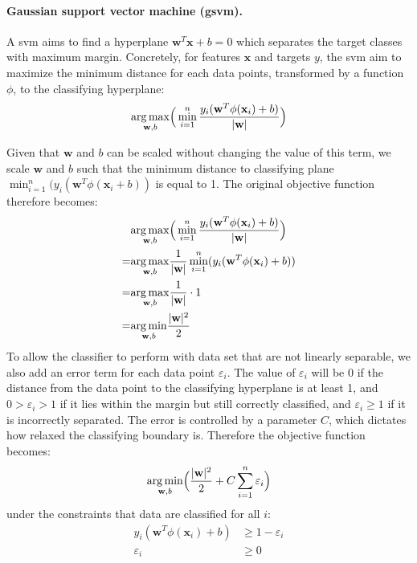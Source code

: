 \paragraph{Gaussian support vector machine (\gls{gsvm}).}
A \gls{svm} aims to find a hyperplane $\mathbf{w}^T\mathbf{x}+b=0$ which separates the target classes with maximum margin. Concretely, for features $\mathbf{x}$ and targets $y$, the \gls{svm} aim to maximize the minimum distance for each data points, transformed by a function $\phi$, to the classifying hyperplane:
\begin{equation} \label{dist}
    \underset{\mathbf{w},b}{\operatorname{arg\,max}}\Big(\min_{i=1}^{n}\frac{y_i(\mathbf{w}^T\phi(\mathbf{x}_i)+b)}{|\mathbf{w}|}\Big)
\end{equation}
 
Given that $\mathbf{w}$ and $b$ can be scaled without changing the value of this term, we scale $\mathbf{w}$ and $b$ such that the minimum distance to classifying plane $\min_{i=1}^n(y_i(\mathbf{w}^T\phi(\mathbf{x}_i + b))$ is equal to 1. The original objective function therefore becomes:
\begin{align*}
    &\underset{\mathbf{w},b}{\operatorname{arg\,max}}\Big(\min_{i=1}^{n}\frac{y_i(\mathbf{w}^T\phi(\mathbf{x}_i)+b)}{|\mathbf{w}|}\Big) \\
    =&\underset{\mathbf{w},b}{\operatorname{arg\,max}}\frac{1}{|\mathbf{w}|}\min_{i=1}^{n}(y_i(\mathbf{w}^T\phi(\mathbf{x}_i)+b)) \\
    =&\underset{\mathbf{w},b}{\operatorname{arg\,max}}\frac{1}{|\mathbf{w}|} \cdot 1 \\
    =&\underset{\mathbf{w},b}{\operatorname{arg\,min}}\frac{|\mathbf{w}|^2}{2}
\end{align*}
To allow the classifier to perform with data set that are not linearly separable, we also add an error term for each data point $\varepsilon_i$. The value of $\varepsilon_i$ will be $0$ if the distance from the data point to the classifying hyperplane is at least 1, and $0>\varepsilon_i>1$ if it lies within the margin but still correctly classified, and $\varepsilon_i \geq 1$ if it is incorrectly separated. The error is controlled by a parameter $C$, which dictates how relaxed the classifying boundary is. Therefore the objective function becomes:
\begin{equation*}
    \underset{\mathbf{w},b}{\operatorname{arg\,min}}\Big(\frac{|\mathbf{w}|^2}{2} + C\sum_{i=1}^n \varepsilon_i\Big)
\end{equation*}
under the constraints that data are classified for all $i$:
\begin{align*}
    y_i (\mathbf{w}^T\phi(\mathbf{x}_i) + b) &\geq 1 - \varepsilon_i \\ 
    \varepsilon_i &\geq 0
\end{align*}
